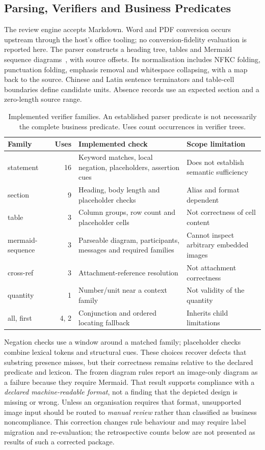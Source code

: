 \documentclass[computers,article,submit,moreauthors]{Definitions/mdpi}
\begin{document}
\subsection{Parsing, Verifiers and Business Predicates}\label{sec:verifiers}

The review engine accepts Markdown. Word and PDF conversion occurs upstream through the host's office tooling; no conversion-fidelity evaluation is reported here. The parser constructs a heading tree, tables and Mermaid sequence diagrams~\cite{mermaid}, with source offsets. Its normalisation includes NFKC folding, punctuation folding, emphasis removal and whitespace collapsing, with a map back to the source. Chinese and Latin sentence terminators and table-cell boundaries define candidate units. Absence records use an expected section and a zero-length source range.

\begin{table}[!ht]
\caption{Implemented verifier families. An established parser predicate is not necessarily the complete business predicate. Uses count occurrences in verifier trees.}
\label{tab:verifiers}
\centering\footnotesize
\begin{tabularx}{\textwidth}{@{}p{2.4cm}rXX@{}}
\toprule
Family & Uses & Implemented check & Scope limitation \\
\midrule
statement & 16 & Keyword matches, local negation, placeholders, assertion cues & Does not establish semantic sufficiency \\
section & 9 & Heading, body length and placeholder checks & Alias and format dependent \\
table & 3 & Column groups, row count and placeholder cells & Not correctness of cell content \\
mermaid-sequence & 3 & Parseable diagram, participants, messages and required families & Cannot inspect arbitrary embedded images \\
cross-ref & 3 & Attachment-reference resolution & Not attachment correctness \\
quantity & 1 & Number/unit near a context family & Not validity of the quantity \\
all, first & 4, 2 & Conjunction and ordered locating fallback & Inherits child limitations \\
\bottomrule
\end{tabularx}
\end{table}

Negation checks use a window around a matched family; placeholder checks combine lexical tokens and structural cues. These choices recover defects that substring presence misses, but their correctness remains relative to the declared predicate and lexicon. The frozen diagram rules report an image-only diagram as a failure because they require Mermaid. That result supports compliance with a \emph{declared machine-readable format}, not a finding that the depicted design is missing or wrong. Unless an organisation requires that format, unsupported image input should be routed to \emph{manual review} rather than classified as business noncompliance. This correction changes rule behaviour and may require label migration and re-evaluation; the retrospective counts below are not presented as results of such a corrected package.
\end{document}

